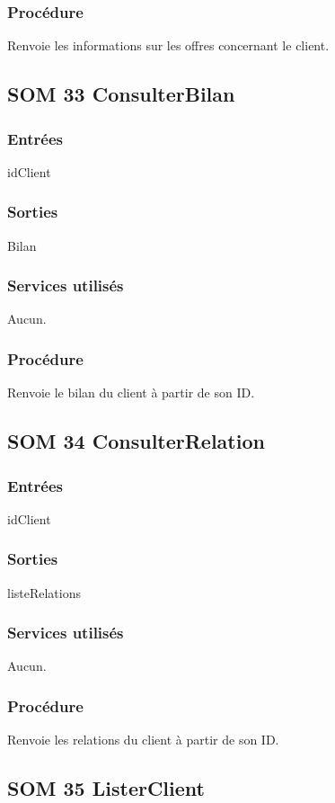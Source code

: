 \subsubsection{Procédure}
Renvoie les informations sur les offres concernant le client.

\subsection{SOM 33 ConsulterBilan}
\subsubsection{Entrées}
idClient
\subsubsection{Sorties}
Bilan
\subsubsection{Services utilisés}
Aucun.
\subsubsection{Procédure}
Renvoie le bilan du client à partir de son ID.

\subsection{SOM 34 ConsulterRelation}
\subsubsection{Entrées}
idClient
\subsubsection{Sorties}
listeRelations
\subsubsection{Services utilisés}
Aucun.
\subsubsection{Procédure}
Renvoie les relations du client à partir de son ID.

\subsection{SOM 35 ListerClient}
